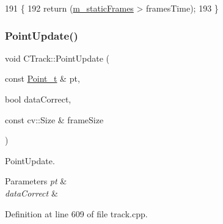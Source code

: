 \begin{DoxyCode}
191 \{
192     \textcolor{keywordflow}{return} (\mbox{\hyperlink{class_c_track_abafeef3579e8b8ee12dd6e8c788c368e}{m\_staticFrames}} > framesTime);
193 \}
\end{DoxyCode}
\mbox{\label{class_c_track_a19453a750a9ec71d6f3465f6031ad64b}} 
\subsubsection{\texorpdfstring{Point\+Update()}{PointUpdate()}}
{\footnotesize\ttfamily void C\+Track\+::\+Point\+Update (\begin{DoxyParamCaption}\item[{const \mbox{\hyperlink{defines_8h_a8c42696da8f098b91374a8e8bb84b430}{Point\+\_\+t}} \&}]{pt,  }\item[{bool}]{data\+Correct,  }\item[{const cv\+::\+Size \&}]{frame\+Size }\end{DoxyParamCaption})\hspace{0.3cm}{\ttfamily [private]}}



Point\+Update. 


\begin{DoxyParams}{Parameters}
{\em pt} & \\
\hline
{\em data\+Correct} & \\
\hline
\end{DoxyParams}


Definition at line 609 of file track.\+cpp.


